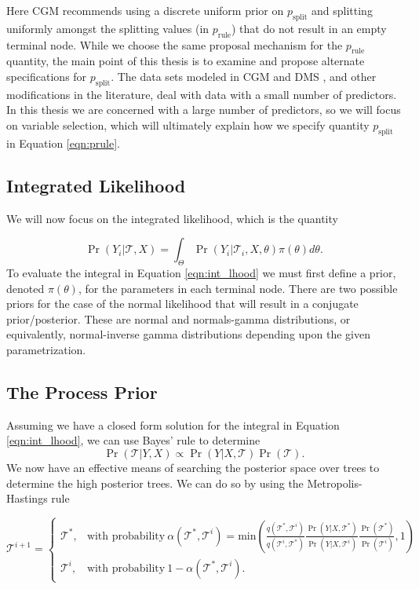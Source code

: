 Here CGM recommends using a discrete uniform prior on $p_{\text{split}}$ and splitting uniformly amongst the splitting values (in $p_{\text{rule}}$) that do not result in an empty terminal node. While we choose the same proposal mechanism for the $p_{\text{rule}}$ quantity, the main point of this thesis is to examine and propose alternate specifications for $p_{\text{split}}$. The data sets modeled in CGM \cite{chipman1998bayesian} and DMS \cite{denison1998bayesian}, and other modifications in the literature, deal with data with a small number of predictors. In this thesis we are concerned with a large number of predictors, so we will focus on variable selection, which will ultimately explain how we specify quantity $p_{\text{split}}$ in Equation \ref{eqn:prule}. 

\subsection{Integrated Likelihood}
We will now focus on the integrated likelihood, which is the quantity 

\begin{equation}\label{eqn:int_lhood}
\Pr(Y_i \vert \mathcal{T}, X) = \int_{\Theta}\Pr(Y_i \vert \mathcal{T}_i, X, \theta)\pi(\theta)d\theta.
\end{equation}
To evaluate the integral in Equation \ref{eqn:int_lhood} we must first define a prior, denoted $\pi(\theta)$, for the parameters in each terminal node. 
There are two possible priors for the case of the normal likelihood that will result in a conjugate prior/posterior. These are normal and normals-gamma distributions, or equivalently, normal-inverse gamma distributions depending upon the given parametrization. 

\subsection{The Process Prior}

Assuming we have a closed form solution for the integral in Equation \ref{eqn:int_lhood}, we can use Bayes' rule to determine 
\begin{equation}\label{eqn:tree_post}
\Pr(\mathcal{T} \vert Y , X) \propto \Pr(Y \vert X ,\mathcal{T})\Pr(\mathcal{T}).
\end{equation} 
We now have an effective means of searching the posterior space over trees to determine the high posterior trees. We can do so by using the Metropolis-Hastings rule 

\begin{equation}\label{eqn:MHrule}
\mathcal{T}^{i+1} =\begin{cases}
\mathcal{T}^*, & \text{with probability}\ \alpha(\mathcal{T}^*, \mathcal{T}^i) = \text{min}\left(\frac{q(\mathcal{T}^*, \mathcal{T}^i)}{q(\mathcal{T}^i, \mathcal{T}^*)}\frac{\Pr(Y\vert X, \mathcal{T}^*)}{\Pr(Y\vert X,\mathcal{T}^i)}\frac{\Pr(\mathcal{T}^{*})}{\Pr(\mathcal{T}^i)},1 \right) \\
\mathcal{T}^{i}, & \text{with probability}\ 1-\alpha(\mathcal{T}^*, \mathcal{T}^i).
\end{cases} \end{equation}

